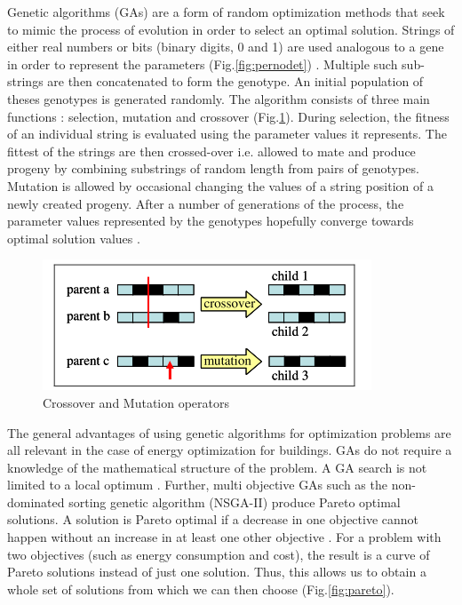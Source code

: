 Genetic algorithms (GAs) are a form of random optimization methods that seek to mimic the process of evolution in order to select an optimal solution. Strings of either real numbers or  bits (binary digits, 0 and 1) are used analogous to a gene in order to represent the parameters (Fig.\ref{fig:pernodet}) \cite{Pernodet2009} \cite{Coley2002}. Multiple such sub-strings are then concatenated to form the genotype. An initial population of theses genotypes is generated randomly. The algorithm consists of three main functions : selection, mutation and crossover (Fig.\ref{fig:pernodet2}). During selection, the fitness of an individual string is evaluated using the parameter values it represents. The fittest of the strings are then crossed-over i.e. allowed to mate and produce progeny by combining substrings of random length from pairs of genotypes. Mutation is allowed by occasional changing the values of a string position of a newly created progeny. After a number of generations of the process, the parameter values represented by the genotypes hopefully converge towards optimal solution values \cite{Coley2002}.

\begin{figure}[htbp]
\centering
\includegraphics[width =0.7\linewidth]{images/pernodet2.png}
\caption{Crossover and Mutation operators \cite{Pernodet2009}}
\label{fig:pernodet2}
\end{figure}


The general advantages of using genetic algorithms for optimization problems are all relevant in the case of energy optimization for buildings. GAs do not 
require a knowledge of the mathematical structure of the problem. A GA search is not limited to a local optimum \cite{Pernodet2009}. Further, multi objective GAs such as the non-dominated sorting genetic algorithm (NSGA-II) produce Pareto optimal solutions. A solution is Pareto optimal if a decrease in one objective cannot happen without an increase in at least one other objective \cite{Deb2002}\cite{Pernodet2009}. For a problem with two objectives (such as energy consumption and cost), the result is a curve of Pareto solutions instead of just one solution. Thus, this allows us to obtain a whole set of solutions from which we can then choose (Fig.\ref{fig:pareto}). %

